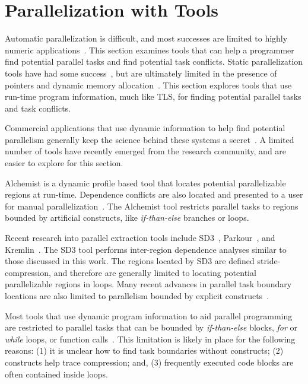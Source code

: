 \documentclass[defaultstyle,11pt]{thesis}
\begin{document}
\section{Parallelization with Tools}
\label{sec:paralleltools}

Automatic parallelization is difficult, and most successes are limited
to highly numeric
applications~\cite{larus:1993:pads,ramaseshan:08:nc}.  This section
examines tools that can help a programmer find potential parallel
tasks and find potential task conflicts.  Static parallelization tools
have had some success~\cite{kennedy:91:pads}, but are ultimately
limited in the presence of pointers and dynamic memory
allocation~\cite{minjang:10:micro}. This section explores tools that
use run-time program information, much like TLS, for finding potential
parallel tasks and task conflicts.

Commercial applications that use dynamic information to help find
potential parallelism generally keep the science behind these systems
a secret~\cite{cogswell:2010:eweek, vectorfabrics:11:ws}.  A limited
number of tools have recently emerged from the research community, and
are easier to explore for this section.

Alchemist is a dynamic profile based tool that locates potential
parallelizable regions at run-time.  Dependence conflicts are also
located and presented to a user for manual
parallelization~\cite{zhang:09:cgo}.  The Alchemist tool restricts
parallel tasks to regions bounded by artificial constructs, like
\textit{if-than-else} branches or loops.

Recent research into parallel extraction tools include
SD3~\cite{minjang:10:micro}, Parkour~\cite{jeon:2011:hotpar}, and
Kremlin~\cite{garcia:2011:pldi}. The SD3 tool performs inter-region
dependence analyses similar to those discussed in this work.  The
regions located by SD3 are defined stride-compression, and therefore
are generally limited to locating potential parallelizable regions in
loops.  Many recent advances in parallel task boundary locations are
also limited to parallelism bounded by explicit
constructs~\cite{jeon:2011:hotpar, garcia:2011:pldi}.

Most tools that use dynamic program information to aid parallel
programming are restricted to parallel tasks that can be bounded by
\textit{if-than-else} blocks, \textit{for} or \textit{while} loops, or
function calls~\cite{zhang:09:cgo, minjang:10:micro, jeon:2011:hotpar,
  garcia:2011:pldi}.  This limitation is likely in place for the
following reasons: (1) it is unclear how to find task boundaries
without constructs; (2) constructs help trace compression; and, (3)
frequently executed code blocks are often contained inside loops.
\end{document}
